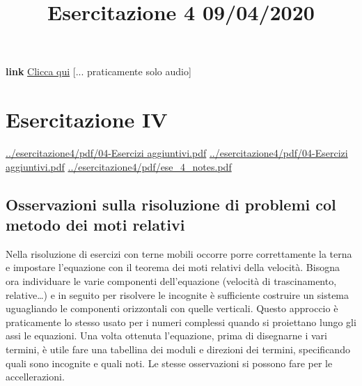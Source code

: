\title{Esercitazione 4 09/04/2020}\newline
\textbf{link} \href{https://web.microsoftstream.com/video/d71ffb36-a843-491f-a33d-da4a7d0b0af9}{Clicca qui} [... praticamente solo audio]
\section{Esercitazione IV}
\url{../esercitazione4/pdf/04-Esercizi aggiuntivi.pdf}\newline
\url{../esercitazione4/pdf/04-Esercizi aggiuntivi.pdf}\newline
\url{../esercitazione4/pdf/ese_4_notes.pdf}
\subsection{Osservazioni sulla risoluzione di problemi col metodo dei moti relativi}
Nella risoluzione di esercizi con terne mobili occorre porre correttamente la terna e impostare l'equazione con il teorema dei moti relativi della velocità. Bisogna ora individuare le varie componenti dell'equazione (velocità di trascinamento, relative\dots) e in seguito per risolvere le incognite è sufficiente costruire un sistema uguagliando le componenti orizzontali con quelle verticali. Questo approccio è praticamente lo stesso usato per i numeri complessi quando si proiettano lungo gli assi le equazioni.\newline
Una volta ottenuta l'equazione, prima di disegnarne i vari termini, è utile fare una tabellina dei moduli e direzioni dei termini, specificando quali sono incognite e quali noti.\newline
Le stesse osservazioni si possono fare per le accellerazioni.